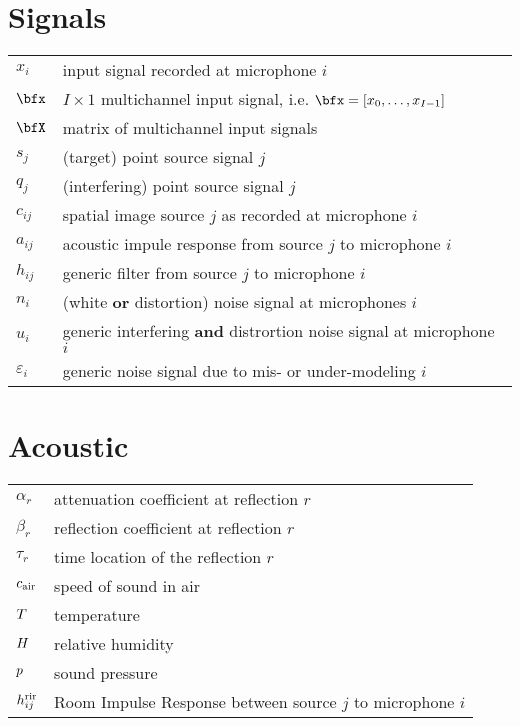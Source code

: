 \section*{Signals}
\begin{table}[H]
    \begin{tabular}{ll}
        $x_i$     & input signal recorded at microphone $i$\\
        $\bfx$    & $I \times 1$ multichannel input signal, i.e. $\bfx = [x_0, \dots, x_{I-1}]$ \\
        $\bfX$    & matrix of multichannel input signals\\
        $s_j$     & (target) point source signal $j$ \\
        $q_j$     & (interfering) point source signal $j$ \\
        $c_{ij}$  & spatial image source $j$ as recorded at microphone $i$\\
        $a_{ij}$  & acoustic impule response from source $j$ to microphone $i$ \\
        $h_{ij}$  & generic filter from source $j$ to microphone $i$ \\
        $n_{i}$   & (white \textbf{or} distortion) noise signal at microphones $i$\\
        $u_{i}$   & generic interfering \textbf{and} distrortion noise signal at microphone $i$ \\
        $\varepsilon_{i}$   & generic noise signal due to mis- or under-modeling $i$ \\
    \end{tabular}
\end{table}

\section*{Acoustic}
\begin{table}[H]
    \begin{tabular}{ll}
        $\alpha_{r}$   & attenuation coefficient at reflection $r$\\
        $\beta_{r}$    & reflection coefficient at reflection $r$\\
        $\tau_{r}$     & time location of the reflection $r$\\
        $c_\text{air}$         & speed of sound in air\\
        $T$  & temperature\\
        $H$    & relative humidity\\
        $p$     & sound pressure\\
        $h^{\text{rir}}_{ij}$     & Room Impulse Response between source $j$ to microphone $i$ \\
    \end{tabular}
\end{table}


